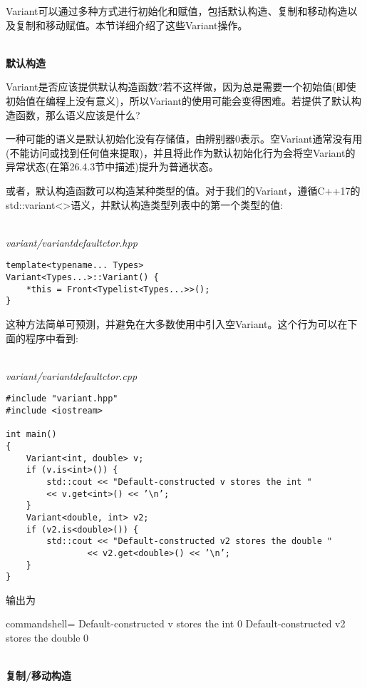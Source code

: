 Variant可以通过多种方式进行初始化和赋值，包括默认构造、复制和移动构造以及复制和移动赋值。本节详细介绍了这些Variant操作。

\hspace*{\fill} \\ %
\noindent
\textbf{默认构造}

Variant是否应该提供默认构造函数?若不这样做，因为总是需要一个初始值(即使初始值在编程上没有意义)，所以Variant的使用可能会变得困难。若提供了默认构造函数，那么语义应该是什么?

一种可能的语义是默认初始化没有存储值，由辨别器0表示。空Variant通常没有用(不能访问或找到任何值来提取)，并且将此作为默认初始化行为会将空Variant的异常状态(在第26.4.3节中描述)提升为普通状态。

或者，默认构造函数可以构造某种类型的值。对于我们的Variant，遵循C++17的std::variant<>语义，并默认构造类型列表中的第一个类型的值:

\hspace*{\fill} \\ %
\noindent
\textit{variant/variantdefaultctor.hpp}
\begin{lstlisting}[style=styleCXX]
template<typename... Types>
Variant<Types...>::Variant() {
	*this = Front<Typelist<Types...>>();
}
\end{lstlisting}

这种方法简单可预测，并避免在大多数使用中引入空Variant。这个行为可以在下面的程序中看到:

\hspace*{\fill} \\ %
\noindent
\textit{variant/variantdefaultctor.cpp}
\begin{lstlisting}[style=styleCXX]
#include "variant.hpp"
#include <iostream>

int main()
{
	Variant<int, double> v;
	if (v.is<int>()) {
		std::cout << "Default-constructed v stores the int "
		<< v.get<int>() << ’\n’;
	}
	Variant<double, int> v2;
	if (v2.is<double>()) {
		std::cout << "Default-constructed v2 stores the double "
				<< v2.get<double>() << ’\n’;
	}
}
\end{lstlisting}

输出为

\begin{tcblisting}{commandshell={}}
Default-constructed v stores the int 0
Default-constructed v2 stores the double 0
\end{tcblisting}

\hspace*{\fill} \\ %
\noindent
\textbf{复制/移动构造}

